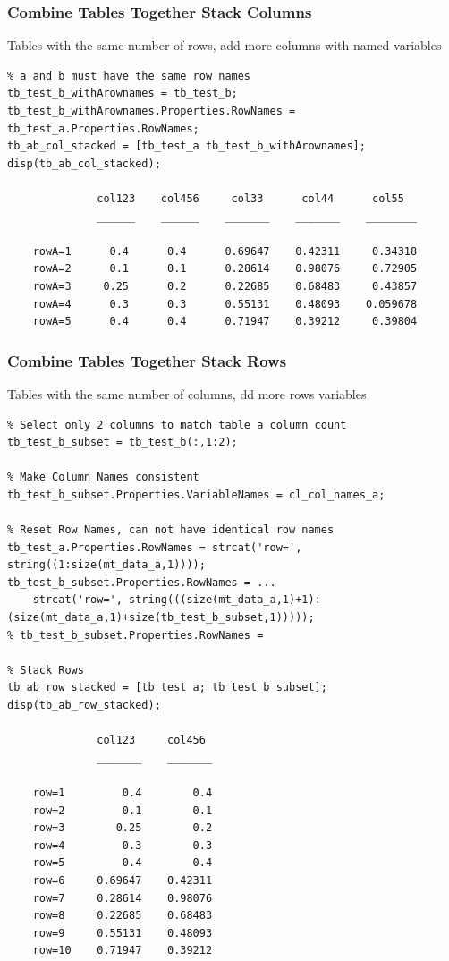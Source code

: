 \documentclass[
]{book}
\begin{document}
\hypertarget{combine-tables-together-stack-columns}{%
\subsubsection{Combine Tables Together Stack Columns}\label{combine-tables-together-stack-columns}}

Tables with the same number of rows, add more columns with named
variables

\begin{verbatim}
% a and b must have the same row names
tb_test_b_withArownames = tb_test_b;
tb_test_b_withArownames.Properties.RowNames = tb_test_a.Properties.RowNames;
tb_ab_col_stacked = [tb_test_a tb_test_b_withArownames];
disp(tb_ab_col_stacked);

              col123    col456     col33      col44      col55  
              ______    ______    _______    _______    ________

    rowA=1      0.4      0.4      0.69647    0.42311     0.34318
    rowA=2      0.1      0.1      0.28614    0.98076     0.72905
    rowA=3     0.25      0.2      0.22685    0.68483     0.43857
    rowA=4      0.3      0.3      0.55131    0.48093    0.059678
    rowA=5      0.4      0.4      0.71947    0.39212     0.39804
\end{verbatim}

\hypertarget{combine-tables-together-stack-rows}{%
\subsubsection{Combine Tables Together Stack Rows}\label{combine-tables-together-stack-rows}}

Tables with the same number of columns, dd more rows variables

\begin{verbatim}
% Select only 2 columns to match table a column count
tb_test_b_subset = tb_test_b(:,1:2);

% Make Column Names consistent
tb_test_b_subset.Properties.VariableNames = cl_col_names_a;

% Reset Row Names, can not have identical row names
tb_test_a.Properties.RowNames = strcat('row=', string((1:size(mt_data_a,1))));
tb_test_b_subset.Properties.RowNames = ...
    strcat('row=', string(((size(mt_data_a,1)+1):(size(mt_data_a,1)+size(tb_test_b_subset,1)))));
% tb_test_b_subset.Properties.RowNames =

% Stack Rows
tb_ab_row_stacked = [tb_test_a; tb_test_b_subset];
disp(tb_ab_row_stacked);

              col123     col456 
              _______    _______

    row=1         0.4        0.4
    row=2         0.1        0.1
    row=3        0.25        0.2
    row=4         0.3        0.3
    row=5         0.4        0.4
    row=6     0.69647    0.42311
    row=7     0.28614    0.98076
    row=8     0.22685    0.68483
    row=9     0.55131    0.48093
    row=10    0.71947    0.39212
\end{verbatim}
\end{document}
